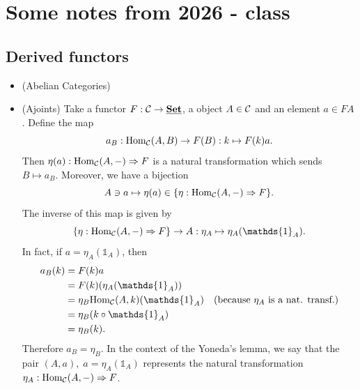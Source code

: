 \chapter{Some notes from 2026 - class}
\section{Derived functors}
\begin{itemize}
    \item(Abelian Categories)\TODO 
    \item(Ajoints) 
        Take a functor $F:\mathcal{C}\to\underline{\textbf{Set}}$, a object $A\in\mathcal{C}$ and an element $a\in FA$. Define the map 
        \begin{equation}
            a_B:\text{Hom}_{\mathcal{C}}(A,B)\to F(B):k\mapsto F(k)a.
        \end{equation}
        Then $\eta(a):\text{Hom}_{\mathcal{C}}(A,-)\Rightarrow F$ is a natural transformation which sends $B\mapsto a_B$. 
        Moreover, we have a bijection 
        \begin{equation}
            A\ni a\mapsto \eta(a)\in\{\eta:\text{Hom}_{\mathcal{C}}(A,-)\Rightarrow F\}.
        \end{equation}
        The inverse of this map is given by 
        \begin{equation}
            \{\eta:\Hom_{\callC}(A,-)\Rightarrow F\}\to A: \eta_A\mapsto \eta_A(\mathds{1}_A).
        \end{equation}
        In fact, if $a=\eta_A(\mathds{1}_A)$, then 
        \begin{equation}
            \begin{split}
                a_B(k)&=F(k)a\\
                &=F(k)(\eta_A(\mathds{1}_A))\\
                &=\eta_B\Hom_{\callC}(A,k)(\mathds{1}_A)\quad(\text{because }\eta_A\text{ is a nat. transf.})\\
                &=\eta_B(k\circ \mathds{1}_A)\\
                &=\eta_B(k). 
            \end{split}
        \end{equation}
        Therefore $a_B=\eta_B$. In the context of the Yoneda's lemma, we say that the pair 
        $(A,a),\;a=\eta_A(\mathds{1}_A)$ represents the natural transformation $\eta_A:\text{Hom}_{\mathcal{C}}(A,-)\Rightarrow F$.


\end{itemize}
